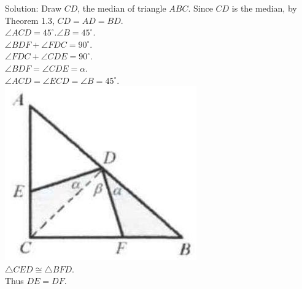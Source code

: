 \documentclass{article}
\begin{document}
Solution:
Draw \(C D\), the median of triangle \(A B C\). Since \(C D\) is the median, by Theorem 1.3, \(C D=A D=B D\).\\
\(\angle A C D=45^{\circ} . \angle B=45^{\circ}\).\\
\(\angle B D F+\angle F D C=90^{\circ}\).\\
\(\angle F D C+\angle C D E=90^{\circ}\).\\
\(\angle B D F=\angle C D E=\alpha\).\\
\(\angle A C D=\angle E C D=\angle B=45^{\circ}\).\\
\centering
\includegraphics[width=\textwidth]{images/013.jpg}\\
\(\triangle C E D \cong \triangle B F D\).\\
Thus \(D E=D F\).
\end{document}
